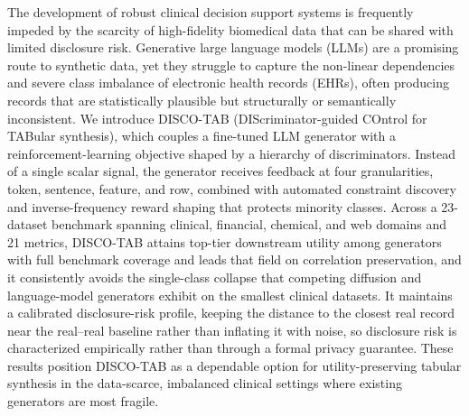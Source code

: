 The development of robust clinical decision support systems is frequently impeded by the scarcity of high-fidelity biomedical data that can be shared with limited disclosure risk. Generative large language models (LLMs) are a promising route to synthetic data, yet they struggle to capture the non-linear dependencies and severe class imbalance of electronic health records (EHRs), often producing records that are statistically plausible but structurally or semantically inconsistent. We introduce DISCO-TAB (DIScriminator-guided COntrol for TABular synthesis), which couples a fine-tuned LLM generator with a reinforcement-learning objective shaped by a hierarchy of discriminators. Instead of a single scalar signal, the generator receives feedback at four granularities, token, sentence, feature, and row, combined with automated constraint discovery and inverse-frequency reward shaping that protects minority classes. Across a 23-dataset benchmark spanning clinical, financial, chemical, and web domains and 21 metrics, DISCO-TAB attains top-tier downstream utility among generators with full benchmark coverage and leads that field on correlation preservation, and it consistently avoids the single-class collapse that competing diffusion and language-model generators exhibit on the smallest clinical datasets. It maintains a calibrated disclosure-risk profile, keeping the distance to the closest real record near the real--real baseline rather than inflating it with noise, so disclosure risk is characterized empirically rather than through a formal privacy guarantee. These results position DISCO-TAB as a dependable option for utility-preserving tabular synthesis in the data-scarce, imbalanced clinical settings where existing generators are most fragile.
